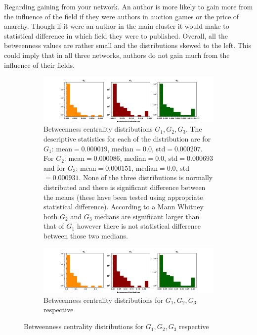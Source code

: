 \documentclass{article}
\theoremstyle{definition}
\begin{document}
Regarding gaining from your network. An author is more likely to gain more
from the influence of the field if they were authors in auction games or the
price of anarchy. Though if it were an author in the main cluster it would make
to statistical difference in which field they were to published. Overall,
all the betweenness values are rather small and the distributions skewed to the
left. This could imply that in all three networks, authors do not gain much from
the influence of their fields.

\begin{figure}[!hbtp]
    \centering
    \begin{subfigure}{\textwidth}\centering
        \includegraphics[width=\textwidth]{./assets/images/betweeness_distributions.pdf}
        \caption{Betweenness centrality distributions \(G_1, G_2, G_3\). The descriptive
        statistics for each of the distribution are for \(G_1\): mean\(=0.000019\),
        median\(=0.0\), std\(=0.000207\). For \(G_2\): mean\(=0.000086\), median\(=0.0\),
        std\(=0.000693\) and for \(G_3\): mean\(=0.000151\), median\(=0.0\), std\(=0.000931\).
        None of the three distributions is normally distributed and there is
        significant difference between the means (these have been tested using
        appropriate statistical difference). According to a Mann Whitney both
        \(G_2\) and \(G_3\) medians are significant larger than that of \(G_1\) however there
        is not statistical difference between those two medians.}\label{fig:betweenness_dist}
    \end{subfigure}
    \begin{subfigure}{\textwidth}\centering
        \includegraphics[width=\textwidth]{./assets/images/betweeness_distributions_clusters.pdf}
        \caption{Betweenness centrality distributions for \(G_1, G_2, G_3\) respective
}
\end{subfigure}
\end{figure}
\end{document}
